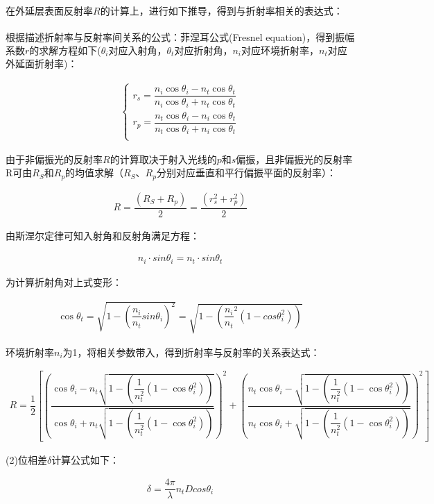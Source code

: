 \documentclass[UTF8]{ctexart}
\begin{document}
在外延层表面反射率$R$的计算上，进行如下推导，得到与折射率相关的表达式：\par 
根据描述折射率与反射率间关系的公式：菲涅耳公式(Fresnel equation)\textsuperscript{\cite{1}}，得到振幅系数$r$的求解方程如下($\theta_i$对应入射角，$\theta_t$对应折射角，$n_i$对应环境折射率，$n_t$对应外延面折射率)：\par 
\begin{align}
	\begin{cases}
		r_s=\dfrac{n_i\cos\theta_i-n_t\cos\theta_t}{n_i\cos\theta_i+n_t\cos\theta_t}\\
		r_p=\dfrac{n_t\cos\theta_i-n_i\cos\theta_t}{n_t\cos\theta_i+n_i\cos\theta_t}\\
	\end{cases}
\end{align}\par 
由于非偏振光的反射率$R$的计算取决于射入光线的$p$和$s$偏振，且非偏振光的反射率R可由$R_S$和$R_p$的均值求解（$R_S$、$R_p$分别对应垂直和平行偏振平面的反射率）：\par  
\begin{align}
	R=\dfrac{(R_S+R_p)}{2}=\dfrac{(r_s^2+r_p^2)}{2}
\end{align}\par 
由斯涅尔定律可知入射角和反射角满足方程：\par 
\begin{align}
	n_i\cdot sin\theta_i=n_t\cdot sin\theta_t
\end{align}\par 
为计算折射角对上式变形：\par 
\begin{align}
	\cos\theta_t=\sqrt{1-(\dfrac{n_i}{n_t}sin\theta_i)^2}=\sqrt{1-({\dfrac{n_i}{n_t}}^2(1-cos\theta_i^2))}
\end{align}\par 
环境折射率$n_i$为1，将相关参数带入，得到折射率与反射率的关系表达式：\par 
\begin{align}
	R=\dfrac{1}{2}[(\dfrac{\cos\theta_i-n_t\sqrt{1-(\dfrac{1}{n_t^2}(1-\cos\theta_i^2))}}{\cos\theta_i+n_t\sqrt{1-(\dfrac{1}{n_t^2}(1-\cos\theta_i^2))}})^2+(\dfrac{n_t\cos\theta_i-\sqrt{1-(\dfrac{1}{n_t^2}(1-\cos\theta_i^2))}}{n_t\cos\theta_i+\sqrt{1-(\dfrac{1}{n_t^2}(1-\cos\theta_i^2))}})^2]
	\label{e10}
\end{align}\par 
(2)位相差$\delta$计算公式如下：\par 
\begin{align}
	\delta=\dfrac{4\pi}{\lambda}n_tDcos\theta_i
	\label{e11}
\end{align}\par 
\end{document}
